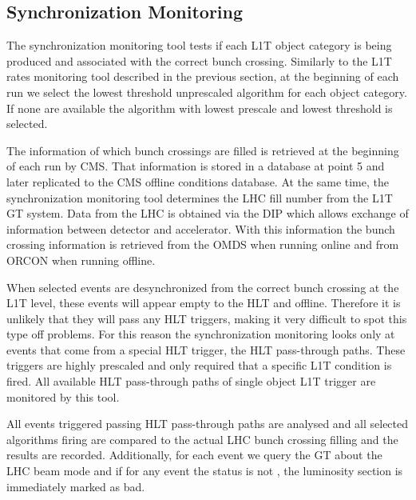 \subsection{Synchronization Monitoring}
\label{SECTION:TechnicalWork_L1TDQM_SynchronizationMonitoring}


The synchronization monitoring tool tests if each \gls{L1T} object category is being produced and associated with the correct bunch crossing. Similarly to the \gls{L1T} rates monitoring tool described in the previous section, at the beginning of each run we select the lowest threshold unprescaled algorithm for each object category. If none are available the algorithm with lowest prescale and lowest threshold is selected.

The information of which bunch crossings are filled is retrieved at the beginning of each run by \gls{CMS}. That information is stored in a database at point 5 and later replicated to the \gls{CMS} offline conditions database. At the same time, the synchronization monitoring tool determines the \gls{LHC} fill number from the \gls{L1T} \gls{GT} system. Data from the \gls{LHC} is obtained via the \gls{DIP} which allows exchange of information between detector and accelerator. With this information the bunch crossing information is retrieved from the \gls{OMDS} when running online and from \gls{ORCON} when running offline.

When selected events are desynchronized from the correct bunch crossing at the \gls{L1T} level, these events will appear empty to the \gls{HLT} and offline. Therefore it is unlikely that they will pass any \gls{HLT} triggers, making it very difficult to spot this type off problems. For this reason the synchronization monitoring looks only at events that come from a special \gls{HLT} trigger, the \gls{HLT} pass-through paths. These triggers are highly prescaled and only required that a specific \gls{L1T} condition is fired. All available \gls{HLT} pass-through paths of single object \gls{L1T} trigger are monitored by this tool.

All events triggered passing \gls{HLT} pass-through paths are analysed and all selected algorithms firing are compared to the actual \gls{LHC} bunch crossing filling and the results are recorded. Additionally, for each event we query the \gls{GT} about the \gls{LHC} beam mode and if for any event the status is not , the luminosity section is immediately marked as bad.

